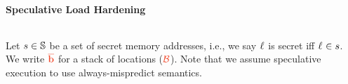 \documentclass[12pt]{article}
\begin{document}
\begin{center}
\end{center}

\paragraph{Speculative Load Hardening} $\;$

Let $s\in\mathbb{S}$ be a set of secret memory addresses, i.e., we say $\ell_{}$ is secret iff $\ell_{}\in s$.
We write $\trg{\overline{b}}$ for a stack of locations ($\trg{\mc{B}}$).
Note that we assume speculative execution to use always-mispredict semantics.
\end{document}

